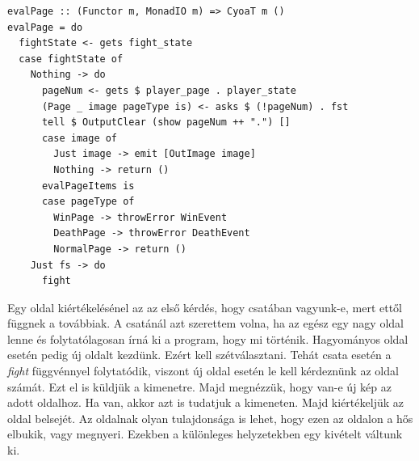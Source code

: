 \documentclass[12pt,a4paper,oneside]{report}
\begin{document}
  \begin{verbatim}
evalPage :: (Functor m, MonadIO m) => CyoaT m ()
evalPage = do
  fightState <- gets fight_state
  case fightState of
    Nothing -> do
      pageNum <- gets $ player_page . player_state
      (Page _ image pageType is) <- asks $ (!pageNum) . fst
      tell $ OutputClear (show pageNum ++ ".") []
      case image of
        Just image -> emit [OutImage image]
        Nothing -> return ()
      evalPageItems is
      case pageType of
        WinPage -> throwError WinEvent
        DeathPage -> throwError DeathEvent
        NormalPage -> return ()
    Just fs -> do
      fight
  \end{verbatim}
  Egy oldal kiértékelésénel az az első kérdés, hogy csatában
  vagyunk-e, mert ettől függnek a továbbiak. A csatánál azt szerettem
  volna, ha az egész egy nagy oldal lenne és folytatólagosan írná ki a
  program, hogy mi történik. Hagyományos oldal esetén pedig új oldalt
  kezdünk. Ezért kell szétválasztani. Tehát csata
  esetén a \emph{fight} függvénnyel folytatódik, viszont új oldal esetén le
  kell kérdeznünk az oldal számát. Ezt el is küldjük a kimenetre. Majd
  megnézzük, hogy van-e új kép az adott oldalhoz. Ha van, akkor azt is
  tudatjuk a kimeneten. Majd kiértékeljük az oldal belsejét. Az
  oldalnak olyan tulajdonsága is lehet, hogy ezen az oldalon a hős
  elbukik, vagy megnyeri. Ezekben a különleges helyzetekben egy
  kivételt váltunk ki.
\end{document}
